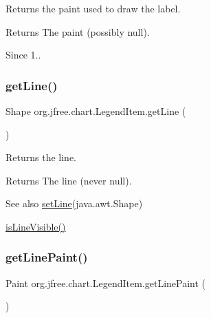 Returns the paint used to draw the label.

\begin{DoxyReturn}{Returns}
The paint (possibly {\ttfamily null}).
\end{DoxyReturn}
\begin{DoxySince}{Since}
1.. 
\end{DoxySince}
\mbox{\label{classorg_1_1jfree_1_1chart_1_1_legend_item_a26acef94552140dba2705f7a859d797c}} 
\subsubsection{\texorpdfstring{get\+Line()}{getLine()}}
{\footnotesize\ttfamily Shape org.\+jfree.\+chart.\+Legend\+Item.\+get\+Line (\begin{DoxyParamCaption}{ }\end{DoxyParamCaption})}

Returns the line.

\begin{DoxyReturn}{Returns}
The line (never {\ttfamily null}).
\end{DoxyReturn}
\begin{DoxySeeAlso}{See also}
\mbox{\hyperlink{classorg_1_1jfree_1_1chart_1_1_legend_item_ac1f02a45ce3660d16dba77a970f28f44}{set\+Line}}(java.\+awt.\+Shape) 

\mbox{\hyperlink{classorg_1_1jfree_1_1chart_1_1_legend_item_af99c8d8cee770e72ecddaf3b2cf467b1}{is\+Line\+Visible()}} 
\end{DoxySeeAlso}
\mbox{\label{classorg_1_1jfree_1_1chart_1_1_legend_item_a5a51f44acf1e7038aa34db01a725b42d}} 
\subsubsection{\texorpdfstring{get\+Line\+Paint()}{getLinePaint()}}
{\footnotesize\ttfamily Paint org.\+jfree.\+chart.\+Legend\+Item.\+get\+Line\+Paint (\begin{DoxyParamCaption}{ }\end{DoxyParamCaption})}

